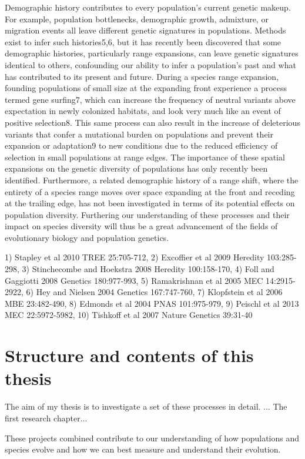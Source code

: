 Demographic history contributes to every population’s current genetic makeup. For example, 
population bottlenecks, demographic growth, admixture, or migration events all leave different 
genetic signatures in populations. Methods exist to infer such histories5,6, but it has recently 
been discovered that some demographic histories, particularly range expansions, can leave 
genetic signatures identical to others, confounding our ability to infer a population’s past 
and what has contributed to its present and future. During a species range expansion, founding 
populations of small size at the expanding front experience a process termed gene surfing7, 
which can increase the frequency of neutral variants above expectation in newly colonized 
habitats, and look very much like an event of positive selection8. This same process can 
also result in the increase of deleterious variants that confer a mutational burden on 
populations and prevent their expansion or adaptation9 to new conditions due to the reduced 
efficiency of selection in small populations at range edges. The importance of these spatial 
expansions on the genetic diversity of populations has only recently been identified. 
Furthermore, a related demographic history of a range shift, where the entirety of a species 
range moves over space expanding at the front and receding at the trailing edge, has not been 
investigated in terms of its potential effects on population diversity. Furthering our 
understanding of these processes and their impact on species diversity will thus be a great 
advancement of the fields of evolutionary biology and population genetics.

1) Stapley et al 2010 TREE 25:705-712, 
2) Excoffier et al 2009 Heredity 103:285-298, 
3) Stinchecombe and Hoekstra 2008 Heredity 100:158-170, 
4) Foll and Gaggiotti 2008 Genetics 180:977-993, 
5) Ramakrishnan et al 2005 MEC 14:2915-2922, 
6) Hey and Nielsen 2004 Genetics 167:747-760, 
7) Klopfstein et al 2006 MBE 23:482-490, 
8) Edmonds et al 2004 PNAS 101:975-979, 
9) Peischl et al 2013 MEC 22:5972-5982, 
10) Tishkoff et al 2007 Nature Genetics 39:31-40


\section{Structure and contents of this thesis}

The aim of my thesis is to investigate a set of these processes in detail.  ... 
The first research chapter...

These projects combined contribute to our understanding of how populations and species evolve 
and how we can best measure and understand their evolution.

